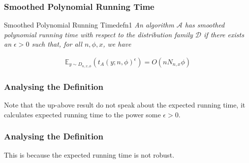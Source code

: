 \begin{frame}
    \frametitle{Smoothed Polynomial Running Time}
    
    \begin{define}{Smoothed Polynomial Running Time}{defn1}
        \textit{An algorithm $\mathcal{A}$ has smoothed polynomial
        running time with respect to the distribution family $\mathcal{D}$
        if there exists an $\epsilon > 0$ such that, for all $n, \phi, x$, we have}
        
            \begin{align*}
                \mathbb{E}_{y \sim D_{n, x, \phi}} \left(t_A(y; n, \phi) ^{\epsilon}\right) = O(nN_{n,x}\phi)
            \end{align*}
    \end{define}
\end{frame}

\begin{frame}
    \frametitle{Analysing the Definition}
    
    \begin{center}
        Note that the up-above result do not speak about the expected running time, it calculates expected running
        time to the power some $\epsilon > 0$.
    \end{center}
\end{frame}

\begin{frame}
    \frametitle{Analysing the Definition}
    
    \begin{center}
        This is because the expected running time is not robust.
    \end{center}
\end{frame}
